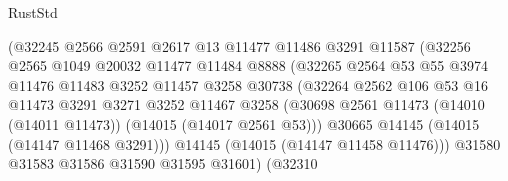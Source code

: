 \begin{lexlean}{RustStd}
\begin{coremodule}
                                  (@32245
                                    @2566
                                    @2591
                                    @2617
                                    @13
                                    @11477
                                    @11486
                                    @3291
                                    @11587
                                    (@32256
                                      @2565
                                      @1049
                                      @20032
                                      @11477
                                      @11484
                                      @8888
                                      (@32265
                                        @2564
                                        @53
                                        @55
                                        @3974
                                        @11476
                                        @11483
                                        @3252
                                        @11457
                                        @3258
                                        @30738
                                        (@32264
                                          @2562
                                          @106
                                          @53
                                          @16
                                          @11473
                                          @3291
                                          @3271
                                          @3252
                                          @11467
                                          @3258
                                          (@30698
                                            @2561
                                            @11473
                                            (@14010 (@14011 @11473))
                                            (@14015 (@14017 @2561 @53)))
                                          @30665
                                          @14145
                                          (@14015 (@14147 @11468 @3291)))
                                        @14145
                                        (@14015 (@14147 @11458 @11476)))
                                      @31580
                                      @31583
                                      @31586
                                      @31590
                                      @31595
                                      @31601)
                                    (@32310

\end{coremodule}
\end{lexlean}
